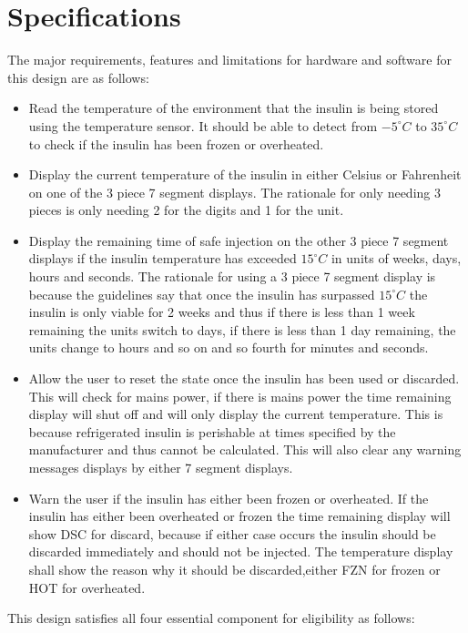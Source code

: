 \section{Specifications}
The major requirements, features and limitations for hardware and software for this design are as follows:
\begin{itemize}
    \item Read the temperature of the environment that the insulin is being stored using the temperature sensor. It should be able to detect from $-5^{\circ}C$ to $35^{\circ}C$ to check if the insulin has been frozen or overheated.
    \item Display the current temperature of the insulin in either Celsius or Fahrenheit on one of the 3 piece 7 segment displays. The rationale for only needing 3 pieces is only needing 2 for the digits and 1 for the unit.
    \item Display the remaining time of safe injection on the other 3 piece 7 segment displays if the insulin temperature has exceeded $15^{\circ}C$ in units of weeks, days, hours and seconds. The rationale for using a 3 piece 7 segment display is because the guidelines say that once the insulin has surpassed $15^{\circ}C$ the insulin is only viable for 2 weeks and thus if there is less than 1 week remaining the units switch to days, if there is less than 1 day remaining, the units change to hours and so on and so fourth for minutes and seconds.
  \item Allow the user to reset the state once the insulin has been used or discarded. This will check for mains power, if there is mains power the time remaining display will shut off and will only display the current temperature. This is because refrigerated insulin is perishable at times specified by the manufacturer and thus cannot be calculated. This will also clear any warning messages displays by either 7 segment displays.
  \item Warn the user if the insulin has either been frozen or overheated. If the insulin has either been overheated or frozen the time remaining display will show DSC for discard, because if either case occurs the insulin should be discarded immediately and should not be injected. The temperature display shall show the reason why it should be discarded,either FZN for frozen or HOT for overheated.
\end{itemize}
This design satisfies all four essential component for eligibility as follows:
